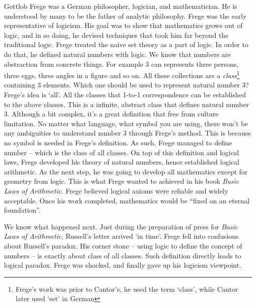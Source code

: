 \documentclass{article}
\begin{document}
Gottlob Frege was a German philosopher, logician, and mathematician. He is understood by many to be the father of analytic philosophy. Frege was the early representative of logicism. His goal was to show that mathematics grows out of logic, and in so doing, he devised techniques that took him far beyond the traditional logic. Frege treated the naive set theory as a part of logic. In order to do that, he defined natural numbers with logic. We know that numbers are abstraction from concrete things. For example 3 can represents three persons, three eggs, three angles in a figure and so on. All these collections are a {\em class}\footnote{Frege's work was prior to Cantor's, he used the term `class', while Cantor later used `set' in German} containing 3 elements. Which one should be used to represent natural number 3? Frege's idea is `all'. All the classes that 1-to-1 correspondence can be established to the above classes. This is a infinite, abstract class that defines natural number 3. Although a bit complex, it's a great definition that free from culture limitation. No matter what language, what symbol you are using, there won't be any ambiguities to understand number 3 through Frege's method. This is because no symbol is needed in Frege's definition. As such, Frege managed to define number -- which is the class of all classes. On top of this definition and logical laws, Frege developed his theory of natural numbers, hence established logical arithmetic. As the next step, he was going to develop all mathematics except for geometry from logic. This is what Frege wanted to achieved in his book {\em Basic Laws of Arithmetic}. Frege believed logical axioms were reliable and widely acceptable. Once his work completed, mathematics would be ``fixed on an eternal foundation''.

We know what happened next. Just during the preparation of press for {\em Basic Laws of Arithmetic}, Russell's letter arrived `in time'. Frege fell into confusions about Russell's paradox. His corner stone -- using logic to define the concept of numbers -- is exactly about class of all classes. Such definition directly leads to logical paradox. Frege was shocked, and finally gave up his logicism viewpoint.
\end{document}
